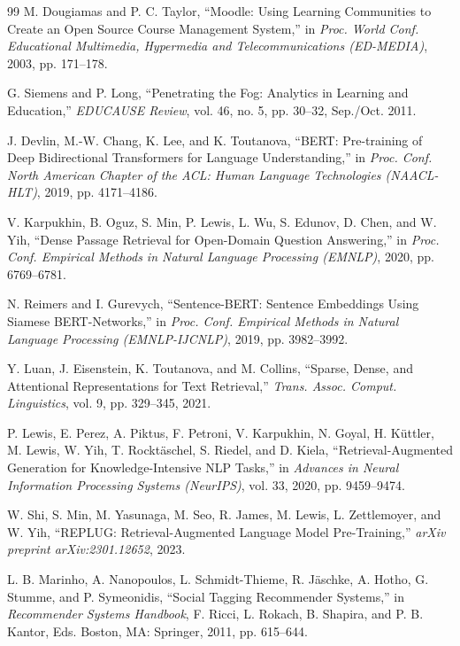 \documentclass[12pt,a4paper]{report}
\begin{document}
\renewcommand{\refname}{References}  %
\renewcommand{\bibname}{References}  %

\begin{thebibliography}{99}
 M. Dougiamas and P. C. Taylor, ``Moodle: Using Learning Communities to Create an Open Source Course Management System,'' in \textit{Proc. World Conf. Educational Multimedia, Hypermedia and Telecommunications (ED-MEDIA)}, 2003, pp. 171--178.

 G. Siemens and P. Long, ``Penetrating the Fog: Analytics in Learning and Education,'' \textit{EDUCAUSE Review}, vol. 46, no. 5, pp. 30--32, Sep./Oct. 2011.

 J. Devlin, M.-W. Chang, K. Lee, and K. Toutanova, ``BERT: Pre-training of Deep Bidirectional Transformers for Language Understanding,'' in \textit{Proc. Conf. North American Chapter of the ACL: Human Language Technologies (NAACL-HLT)}, 2019, pp. 4171--4186.

 V. Karpukhin, B. Oguz, S. Min, P. Lewis, L. Wu, S. Edunov, D. Chen, and W. Yih, ``Dense Passage Retrieval for Open-Domain Question Answering,'' in \textit{Proc. Conf. Empirical Methods in Natural Language Processing (EMNLP)}, 2020, pp. 6769--6781.

 N. Reimers and I. Gurevych, ``Sentence-BERT: Sentence Embeddings Using Siamese BERT-Networks,'' in \textit{Proc. Conf. Empirical Methods in Natural Language Processing (EMNLP-IJCNLP)}, 2019, pp. 3982--3992.

 Y. Luan, J. Eisenstein, K. Toutanova, and M. Collins, ``Sparse, Dense, and Attentional Representations for Text Retrieval,'' \textit{Trans. Assoc. Comput. Linguistics}, vol. 9, pp. 329--345, 2021.

 P. Lewis, E. Perez, A. Piktus, F. Petroni, V. Karpukhin, N. Goyal, H. K{\"u}ttler, M. Lewis, W. Yih, T. Rockt{\"a}schel, S. Riedel, and D. Kiela, ``Retrieval-Augmented Generation for Knowledge-Intensive NLP Tasks,'' in \textit{Advances in Neural Information Processing Systems (NeurIPS)}, vol. 33, 2020, pp. 9459--9474.

 W. Shi, S. Min, M. Yasunaga, M. Seo, R. James, M. Lewis, L. Zettlemoyer, and W. Yih, ``REPLUG: Retrieval-Augmented Language Model Pre-Training,'' \textit{arXiv preprint arXiv:2301.12652}, 2023.

 L. B. Marinho, A. Nanopoulos, L. Schmidt-Thieme, R. J{\"a}schke, A. Hotho, G. Stumme, and P. Symeonidis, ``Social Tagging Recommender Systems,'' in \textit{Recommender Systems Handbook}, F. Ricci, L. Rokach, B. Shapira, and P. B. Kantor, Eds. Boston, MA: Springer, 2011, pp. 615--644.


\end{thebibliography}
\end{document}
